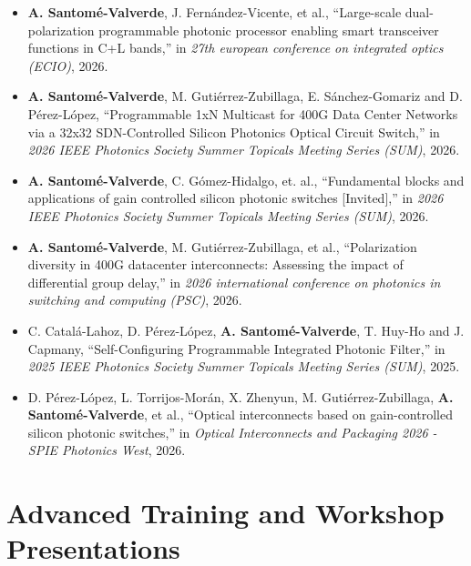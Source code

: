 \begin{itemize}
  
  \item \textbf{A. Santomé-Valverde}, J. Fernández-Vicente, et al., “Large-scale dual-polarization 
  programmable photonic processor enabling smart transceiver functions in C+L bands,” in 
  \textit{27th european conference on integrated optics (ECIO)}, 2026.

  \item \textbf{A. Santomé-Valverde}, M. Gutiérrez-Zubillaga, E. Sánchez-Gomariz and D. Pérez-López, 
  “Programmable 1xN Multicast for 400G Data Center Networks via a 32x32 SDN-Controlled Silicon 
  Photonics Optical Circuit Switch,” in 
  \textit{2026 IEEE Photonics Society Summer Topicals Meeting Series (SUM)}, 2026.

  \item \textbf{A. Santomé-Valverde}, C. Gómez-Hidalgo, et. al., “Fundamental blocks and 
  applications of gain controlled silicon photonic switches [Invited],” in 
  \textit{2026 IEEE Photonics Society Summer Topicals Meeting Series (SUM)}, 2026.

  \item \textbf{A. Santomé-Valverde}, M. Gutiérrez-Zubillaga, et al., “Polarization diversity in 
  400G datacenter interconnects: Assessing the impact of differential group delay,” in 
  \textit{2026 international conference on photonics in switching and computing (PSC)}, 2026.

  \item C. Catalá-Lahoz, D. Pérez-López, \textbf{A. Santomé-Valverde}, T. Huy-Ho and J. Capmany, 
  “Self-Configuring Programmable Integrated Photonic Filter,” in 
  \textit{2025 IEEE Photonics Society Summer Topicals Meeting Series (SUM)}, 2025.

  \item D. Pérez-López, L. Torrijos-Morán, X. Zhenyun, M. Gutiérrez-Zubillaga, 
  \textbf{A. Santomé-Valverde}, et al., “Optical interconnects based on gain-controlled silicon 
  photonic switches,” in 
  \textit{Optical Interconnects and Packaging 2026 - SPIE Photonics West}, 2026.

\end{itemize}

\section*{Advanced Training and Workshop Presentations}

